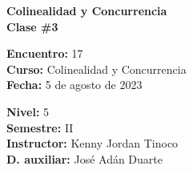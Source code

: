 \begin{center} \textbf
{
    \Large Colinealidad y Concurrencia \\ \vspace{2mm}Clase \#3
}
\end{center}

\begin{multicols}{2}
{
    \textbf{Encuentro:} 17\\
    \textbf{Curso:} Colinealidad y Concurrencia\\
    \textbf{Fecha:} 5 de agosto de 2023\\
    \begin{flushright}
        \textbf{Nivel:} 5\\
        \textbf{Semestre:} II\\
        \textbf{Instructor:} Kenny Jordan Tinoco\\
        \textbf{D. auxiliar: }José Adán Duarte
    \end{flushright}
}
\end{multicols}

\thispagestyle{first-page-style}